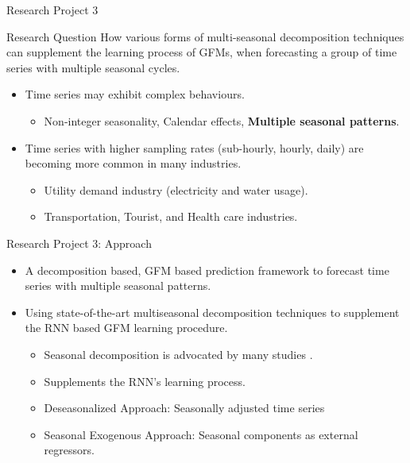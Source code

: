 \documentclass{beamer}
\begin{document}
\begin{frame}{Research Project 3}
   \begin{block}{Research Question}	
	How various forms of multi-seasonal decomposition techniques can supplement the learning process of GFMs, when forecasting a group of time series with multiple seasonal cycles.
	\end{block}
	\begin{itemize}
	\item Time series may exhibit complex behaviours.
		\begin{itemize}
		\item \color{blue} Non-integer seasonality, Calendar effects, \textbf{Multiple seasonal patterns}.
		\end{itemize}
	\item Time series with higher sampling rates (sub-hourly, hourly, daily) are becoming more common in many industries.
		\begin{itemize}
\item \color{blue} Utility demand industry (electricity and water usage).
\item \color{blue} Transportation, Tourist, and Health care industries.
		\end{itemize}
 \end{itemize}
\end{frame} 

\begin{frame}{Research Project 3: Approach}
\begin{itemize}
	\item A decomposition based, GFM based prediction framework to forecast time series with multiple seasonal patterns.
	\vspace{3mm}
	\item Using state-of-the-art multiseasonal decomposition techniques to supplement the RNN based GFM learning procedure.
	\vspace{2mm}
	  \begin{itemize}\color{blue}
		\item Seasonal decomposition is advocated by many studies \cite{Ben_Taieb2011-iu,Zhang2005-pk}.
		\item Supplements the RNN's learning process.
		\item Deseasonalized Approach: Seasonally adjusted time series
		\item Seasonal Exogenous Approach: Seasonal components as external regressors.
	  \end{itemize}			
 	\end{itemize}
\end{frame}
\end{document}
